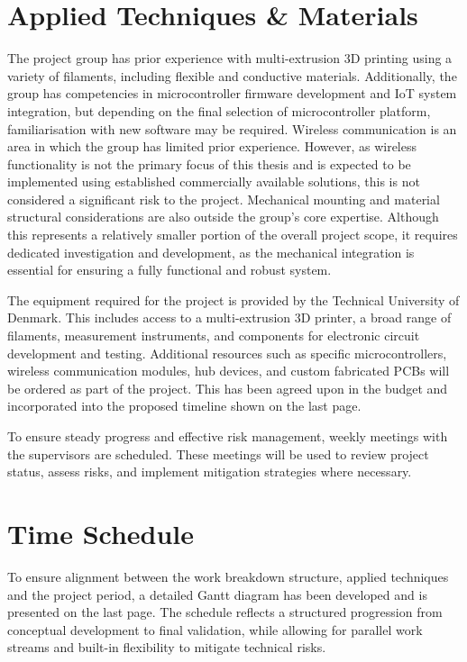 \pagebreak
\section*{Applied Techniques \& Materials}
The project group has prior experience with multi-extrusion 3D printing using a variety of filaments, including flexible and conductive materials.
Additionally, the group has competencies in microcontroller firmware development and IoT system integration, but depending on the final selection of microcontroller platform, familiarisation with new software may be required.
Wireless communication is an area in which the group has limited prior experience. However, as wireless functionality is not the primary focus of this thesis and is expected to be implemented using established commercially available solutions, this is not considered a significant risk to the project.
Mechanical mounting and material structural considerations are also outside the group’s core expertise. Although this represents a relatively smaller portion of the overall project scope, it requires dedicated investigation and development, as the mechanical integration is essential for ensuring a fully functional and robust system.

The equipment required for the project is provided by the Technical University of Denmark. This includes access to a multi-extrusion 3D printer, a broad range of filaments, measurement instruments, and components for electronic circuit development and testing. 
Additional resources such as specific microcontrollers, wireless communication modules, hub devices, and custom fabricated PCBs will be ordered as part of the project.
This has been agreed upon in the budget and incorporated into the proposed timeline shown on the last page.

To ensure steady progress and effective risk management, weekly meetings with the supervisors are scheduled. These meetings will be used to review project status, assess risks, and implement mitigation strategies where necessary.


\section*{Time Schedule}
To ensure alignment between the work breakdown structure, applied techniques and the project period, a detailed Gantt diagram has been developed and is presented on the last page. The schedule reflects a structured progression from conceptual development to final validation, while allowing for parallel work streams and built-in flexibility to mitigate technical risks.

